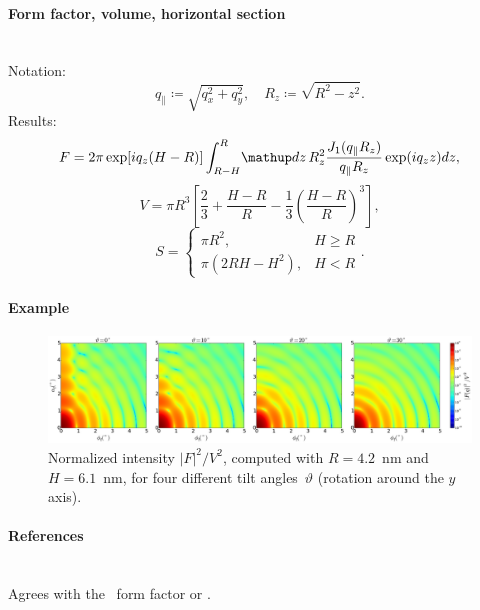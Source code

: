 \paragraph{Form factor, volume, horizontal section}\strut\\
Notation:
\begin{equation*}
  q_{\parallel} \coloneqq \sqrt{q_x^2+q_y^2},\quad
  R_z \coloneqq \sqrt{R^2-z^2}.
\end{equation*}
Results:
\begin{equation*}
F= 2\pi \exp[i q_z (H-R)]\int_{R-H}^{R}\!\d z\, R_z^2
       \frac{J_1(q_{\parallel} R_z) }{q_{\parallel} R_z} \exp(i q_z z) dz,
\end{equation*}
\begin{equation*}
  V=\pi R^3 \left[\dfrac{2}{3} + \dfrac{H-R}{R} - \dfrac{1}{3}\left(\dfrac{H-R}{R}\right)^3\right],
\end{equation*}
\begin{equation*}
  S = \left\{\begin{array}{ll} \pi R^2, & H \geq R \\
         \pi\left(2RH-H^2\right), & H < R \end{array}\right..
\end{equation*}

\paragraph{Example}\strut

\begin{figure}[H]
\begin{center}
\includegraphics[width=\textwidth]{fig/ff2/ff_TruncatedSphere.pdf}
\end{center}
\caption{Normalized intensity $|F|^2/V^2$,
computed with $R=4.2$~nm and $H=6.1$~nm,
for four different tilt angles~$\vartheta$ (rotation around the $y$ axis).}
\end{figure}

\paragraph{References}\strut\\
Agrees with the \IsGISAXS\ form factor
 \cite[Eq.~2.33]{Laz08} or
 \cite[Eq.~228]{ReLL09}.


